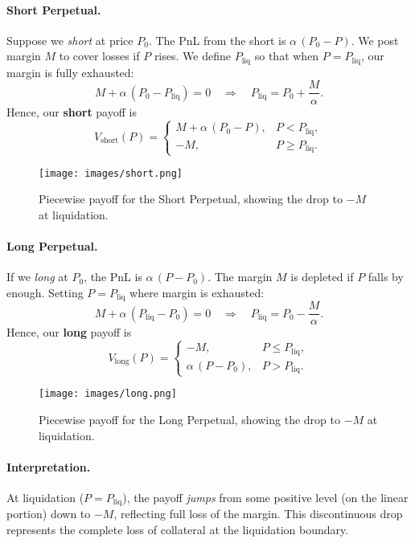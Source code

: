 \documentclass[12pt]{article}
\begin{document}
\paragraph{Short Perpetual.}  
Suppose we \emph{short} at price $P_0$. The PnL from the short is $\alpha\,(P_0 - P)$. We post margin $M$ to cover losses if $P$ rises. We define $P_{\mathrm{liq}}$ so that when $P = P_{\mathrm{liq}}$, our margin is fully exhausted:
\[
M + \alpha\,(P_0 - P_{\mathrm{liq}}) = 0
\quad\Longrightarrow\quad
P_{\mathrm{liq}} = P_0 + \frac{M}{\alpha}.
\]
Hence, our \textbf{short} payoff is
\[
V_{\mathrm{short}}(P) = 
\begin{cases}
M + \alpha\,(P_0 - P), & P < P_{\mathrm{liq}},\\
-M, & P \ge P_{\mathrm{liq}}.
\end{cases}
\]

\begin{figure}[htb]
    \centering
    \texttt{[image: images/short.png]}
    \caption{Piecewise payoff for the Short Perpetual, showing the drop to $-M$ at liquidation.}
    \label{fig:short}
\end{figure}

\paragraph{Long Perpetual.}  
If we \emph{long} at $P_0$, the PnL is $\alpha\,(P - P_0)$. The margin $M$ is depleted if $P$ falls by enough. Setting $P = P_{\mathrm{liq}}$ where margin is exhausted:
\[
M + \alpha\,(P_{\mathrm{liq}} - P_0) = 0
\quad\Longrightarrow\quad
P_{\mathrm{liq}} = P_0 - \frac{M}{\alpha}.
\]
Hence, our \textbf{long} payoff is
\[
V_{\mathrm{long}}(P) = 
\begin{cases}
-M, & P \le P_{\mathrm{liq}},\\
\alpha\,(P - P_0), & P > P_{\mathrm{liq}}.
\end{cases}
\]

\begin{figure}[htb]
    \centering
    \texttt{[image: images/long.png]}
    \caption{Piecewise payoff for the Long Perpetual, showing the drop to $-M$ at liquidation.}
    \label{fig:long}
\end{figure}

\paragraph{Interpretation.}  
At liquidation ($P = P_{\mathrm{liq}}$), the payoff \emph{jumps} from some positive level (on the linear portion) down to $-M$, reflecting full loss of the margin. This discontinuous drop represents the complete loss of collateral at the liquidation boundary.
\end{document}
